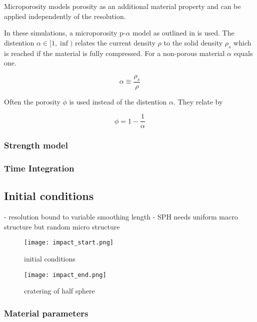 Microporosity models porosity as an additional material property and can be applied independently of the resolution.


In these simulations, a microporosity p-$\alpha$ model as outlined in \cite{} is used. The distention $\alpha \in [1,\inf)$ relates the current density $\rho$ to the solid density $\rho_s$ which is reached if the material is fully compressed. For a non-porous material $\alpha$ equals one.

\begin{equation}
    \alpha \equiv \frac{\rho_s}{\rho}
\end{equation}

Often the porosity $\phi$ is used instead of the distention $\alpha$. They relate by

\begin{equation}
    \phi = 1 - \frac{1}{\alpha}
\end{equation}


\subsubsection{Strength model}

\subsubsection{Time Integration}

\subsection{Initial conditions}
- resolution bound to variable smoothing length
- SPH needs uniform macro structure but random micro structure

\begin{figure}[H]
    \centering
    \texttt{[image: impact\_start.png]}
    \caption{initial conditions}
    \label{fig:impact_start}
\end{figure}

\begin{figure}[H]
    \centering
    \texttt{[image: impact\_end.png]}
    \caption{cratering of half sphere}
    \label{fig:impact_end}
\end{figure}

\subsubsection{Material parameters}


